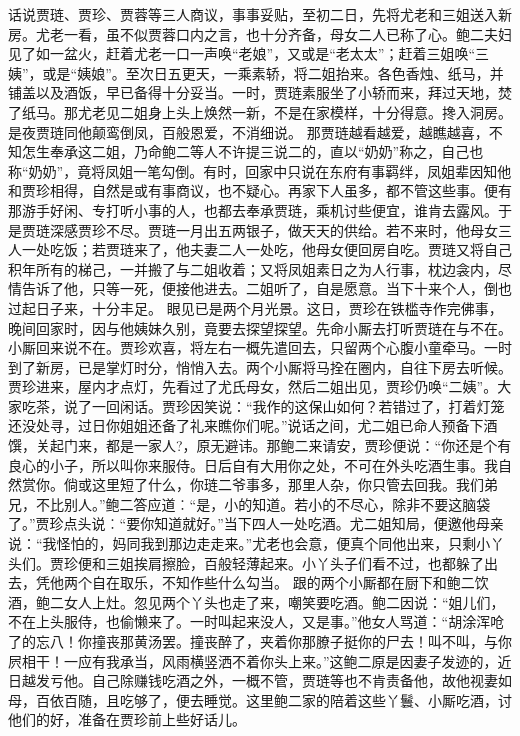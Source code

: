 \documentclass[12pt,oneside]{book}
\begin{document}
话说贾琏、贾珍、贾蓉等三人商议，事事妥贴，至初二日，先将尤老和三姐送入新房。尤老一看，虽不似贾蓉口内之言，也十分齐备，母女二人已称了心。鲍二夫妇见了如一盆火，赶着尤老一口一声唤“老娘”，又或是“老太太”；赶着三姐唤“三姨”，或是“姨娘”。至次日五更天，一乘素轿，将二姐抬来。各色香烛、纸马，并铺盖以及酒饭，早已备得十分妥当。一时，贾琏素服坐了小轿而来，拜过天地，焚了纸马。那尤老见二姐身上头上焕然一新，不是在家模样，十分得意。搀入洞房。是夜贾琏同他颠鸾倒凤，百般恩爱，不消细说。
那贾琏越看越爱，越瞧越喜，不知怎生奉承这二姐，乃命鲍二等人不许提三说二的，直以“奶奶”称之，自己也称“奶奶”，竟将凤姐一笔勾倒。有时，回家中只说在东府有事羁绊，凤姐辈因知他和贾珍相得，自然是或有事商议，也不疑心。再家下人虽多，都不管这些事。便有那游手好闲、专打听小事的人，也都去奉承贾琏，乘机讨些便宜，谁肯去露风。于是贾琏深感贾珍不尽。贾琏一月出五两银子，做天天的供给。若不来时，他母女三人一处吃饭；若贾琏来了，他夫妻二人一处吃，他母女便回房自吃。贾琏又将自己积年所有的梯己，一并搬了与二姐收着；又将凤姐素日之为人行事，枕边衾内，尽情告诉了他，只等一死，便接他进去。二姐听了，自是愿意。当下十来个人，倒也过起日子来，十分丰足。
眼见已是两个月光景。这日，贾珍在铁槛寺作完佛事，晚间回家时，因与他姨妹久别，竟要去探望探望。先命小厮去打听贾琏在与不在。小厮回来说不在。贾珍欢喜，将左右一概先遣回去，只留两个心腹小童牵马。一时到了新房，已是掌灯时分，悄悄入去。两个小厮将马拴在圈内，自往下房去听候。
贾珍进来，屋内才点灯，先看过了尤氏母女，然后二姐出见，贾珍仍唤“二姨”。大家吃茶，说了一回闲话。贾珍因笑说：“我作的这保山如何？若错过了，打着灯笼还没处寻，过日你姐姐还备了礼来瞧你们呢。”说话之间，尤二姐已命人预备下酒馔，关起门来，都是一家人?，原无避讳。那鲍二来请安，贾珍便说：“你还是个有良心的小子，所以叫你来服侍。日后自有大用你之处，不可在外头吃酒生事。我自然赏你。倘或这里短了什么，你琏二爷事多，那里人杂，你只管去回我。我们弟兄，不比别人。”鲍二答应道︰“是，小的知道。若小的不尽心，除非不要这脑袋了。”贾珍点头说︰“要你知道就好。”当下四人一处吃酒。尤二姐知局，便邀他母亲说：“我怪怕的，妈同我到那边走走来。”尤老也会意，便真个同他出来，只剩小丫头们。贾珍便和三姐挨肩擦脸，百般轻薄起来。小丫头子们看不过，也都躲了出去，凭他两个自在取乐，不知作些什么勾当。
跟的两个小厮都在厨下和鲍二饮酒，鲍二女人上灶。忽见两个丫头也走了来，嘲笑要吃酒。鲍二因说：“姐儿们，不在上头服侍，也偷懒来了。一时叫起来没人，又是事。”他女人骂道：“胡涂浑呛了的忘八！你撞丧那黄汤罢。撞丧醉了，夹着你那膫子挺你的尸去！叫不叫，与你屄相干！一应有我承当，风雨横竖洒不着你头上来。”这鲍二原是因妻子发迹的，近日越发亏他。自己除赚钱吃酒之外，一概不管，贾琏等也不肯责备他，故他视妻如母，百依百随，且吃够了，便去睡觉。这里鲍二家的陪着这些丫鬟、小厮吃酒，讨他们的好，准备在贾珍前上些好话儿。
\end{document}
